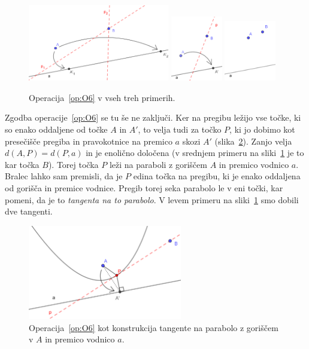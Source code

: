 \begin{figure}[h]
    \centering
    \includegraphics[width=0.55\textwidth]{images/origami_operacije/O6a.png}
    \includegraphics[width=0.2\textwidth]{images/origami_operacije/O6b.png}
    \includegraphics[width=0.2\textwidth]{images/origami_operacije/O6c.png}
    \caption[Operacija~\ref{op:O6}]{Operacija~\ref{op:O6} v vseh treh primerih.}
    \label{fig:O6}
\end{figure}

Zgodba operacije~\ref{op:O6} se tu še ne zaključi. Ker na pregibu ležijo vse točke, ki so enako oddaljene od točke $A$ in $A'$, to velja tudi za točko $P$, ki jo dobimo kot presečišče pregiba in pravokotnice na premico $a$ skozi $A'$ (slika~\ref{fig:O6_parabola}). Zanjo velja $ d(A,P) = d(P,a) $ in je enolično določena (v srednjem primeru na sliki~\ref{fig:O6} je to kar točka $B$). Torej točka $P$ leži na paraboli z goriščem $A$ in premico vodnico $a$. Bralec lahko sam premisli, da je $P$ edina točka na pregibu, ki je enako oddaljena od gorišča in premice vodnice. Pregib torej seka parabolo le v eni točki, kar pomeni, da je to \emph{tangenta na to parabolo}. V levem primeru na sliki~\ref{fig:O6} smo dobili dve tangenti.

\begin{figure}[h]
    \centering
    \includegraphics[width=0.6\textwidth]{images/origami_operacije/O6_parabola.png}
    \caption[Tangenta na parabolo]{Operacija~\ref{op:O6} kot konstrukcija tangente na parabolo z goriščem v $A$ in premico vodnico $a$.}
    \label{fig:O6_parabola}
\end{figure}


